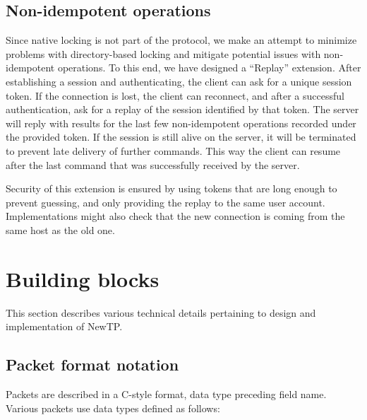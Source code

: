 %

\subsection{Non-idempotent operations}

Since native locking is not part of the protocol, we make an attempt to minimize problems with directory-based
locking and mitigate potential issues with non-idempotent operations. To this end, we have designed
a ``Replay'' extension. After establishing a session and authenticating, the client can ask for a unique
session token. If the connection is lost, the client can reconnect, and after a successful authentication, ask
for a replay of the session identified by that token. The server will reply with results for the last few
non-idempotent operations recorded under the provided token. If the session is still alive on the server, it
will be terminated to prevent late delivery of further commands. This way the client can resume after the last
command that was successfully received by the server.

Security of this extension is ensured by using tokens that are long enough to prevent guessing, and only
providing the replay to the same user account. Implementations might also check that the new connection is
coming from the same host as the old one.


\section{Building blocks}

This section describes various technical details pertaining to design and implementation of NewTP.

%

\subsection{Packet format notation}

Packets are described in a C-style format, data type preceding field name. Various packets use data types
defined as follows:

